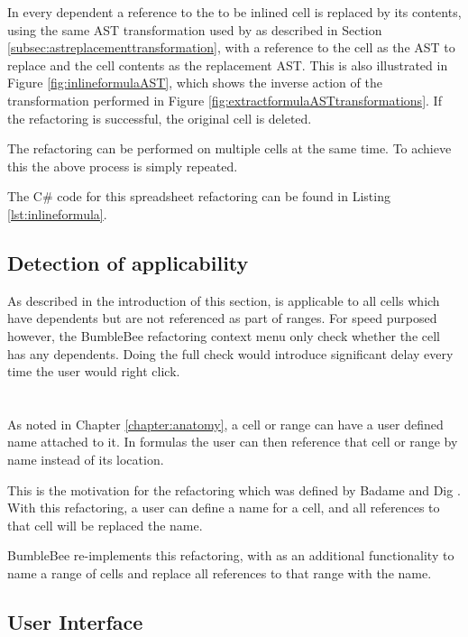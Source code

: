 In every dependent a reference to the to be inlined cell is replaced by its contents, using the same AST transformation used by  as described in Section \ref{subsec:astreplacementtransformation}, with a reference to the cell as the AST to replace and the cell contents as the replacement AST.
This is also illustrated in Figure \ref{fig:inlineformulaAST}, which shows the  inverse action of the transformation performed in Figure \ref{fig:extractformulaASTtransformations}.
If the refactoring is successful, the original cell is deleted.

The refactoring can be performed on multiple cells at the same time.
To achieve this the above process is simply repeated.

The C\# code for this spreadsheet refactoring can be found in Listing \ref{lst:inlineformula}.

\subsection{Detection of applicability}

As described in the introduction of this section,  is applicable to all cells which have dependents but are not referenced as part of ranges.
For speed purposed however, the BumbleBee refactoring context menu only check whether the cell has any dependents.
Doing the full check would introduce significant delay every time the user would right click.

\section{}
\label{refac:introducecellname}

As noted in Chapter \ref{chapter:anatomy}, a cell or range can have a user defined name attached to it.
In formulas the user can then reference that cell or range by name instead of its location.

This is the motivation for the  refactoring which was defined by Badame and Dig \cite{badame2012refactoring}.
With this refactoring, a user can define a name for a cell, and all references to that cell will be replaced the name.

BumbleBee re-implements this refactoring, with as an additional functionality to name a range of cells and replace all references to that range with the name.

\subsection{User Interface}

